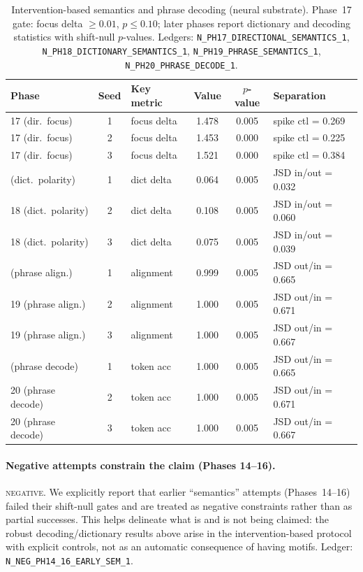 \documentclass[11pt]{article}
\newcommand{\NEG}{\textsc{negative}}
\begin{document}
\begin{table}[t]
\centering
\small
\begin{tabular}{@{}l c l c c l@{}}
\toprule
Phase & Seed & Key metric & Value & $p$-value & Separation \\
\midrule
17 (dir.\ focus) & 1 & focus delta & 1.478 & 0.005 & spike ctl = 0.269 \\
17 (dir.\ focus) & 2 & focus delta & 1.453 & 0.000 & spike ctl = 0.225 \\
17 (dir.\ focus) & 3 & focus delta & 1.521 & 0.000 & spike ctl = 0.384 \\
\addlinespace
18 (dict.\ polarity) & 1 & dict delta & 0.064 & 0.005 & JSD in/out = 0.032 \\
18 (dict.\ polarity) & 2 & dict delta & 0.108 & 0.005 & JSD in/out = 0.060 \\
18 (dict.\ polarity) & 3 & dict delta & 0.075 & 0.005 & JSD in/out = 0.039 \\
\addlinespace
19 (phrase align.) & 1 & alignment & 0.999 & 0.005 & JSD out/in = 0.665 \\
19 (phrase align.) & 2 & alignment & 1.000 & 0.005 & JSD out/in = 0.671 \\
19 (phrase align.) & 3 & alignment & 1.000 & 0.005 & JSD out/in = 0.667 \\
\addlinespace
20 (phrase decode) & 1 & token acc & 1.000 & 0.005 & JSD out/in = 0.665 \\
20 (phrase decode) & 2 & token acc & 1.000 & 0.005 & JSD out/in = 0.671 \\
20 (phrase decode) & 3 & token acc & 1.000 & 0.005 & JSD out/in = 0.667 \\
\bottomrule
\end{tabular}
\caption{Intervention-based semantics and phrase decoding (neural substrate). Phase~17 gate: focus delta $\ge 0.01$, $p \le 0.10$; later phases report dictionary and decoding statistics with shift-null $p$-values. Ledgers: \texttt{N\_PH17\_DIRECTIONAL\_SEMANTICS\_1}, \texttt{N\_PH18\_DICTIONARY\_SEMANTICS\_1}, \texttt{N\_PH19\_PHRASE\_SEMANTICS\_1}, \texttt{N\_PH20\_PHRASE\_DECODE\_1}.}
\label{tab:semantic_decode}
\end{table}

\paragraph{Negative attempts constrain the claim (Phases 14--16).}
\NEG. We explicitly report that earlier ``semantics'' attempts (Phases~14--16) failed their shift-null gates and are treated as negative constraints rather than as partial successes. This helps delineate what is and is not being claimed: the robust decoding/dictionary results above arise in the intervention-based protocol with explicit controls, not as an automatic consequence of having motifs. Ledger: \texttt{N\_NEG\_PH14\_16\_EARLY\_SEM\_1}.
\end{document}
